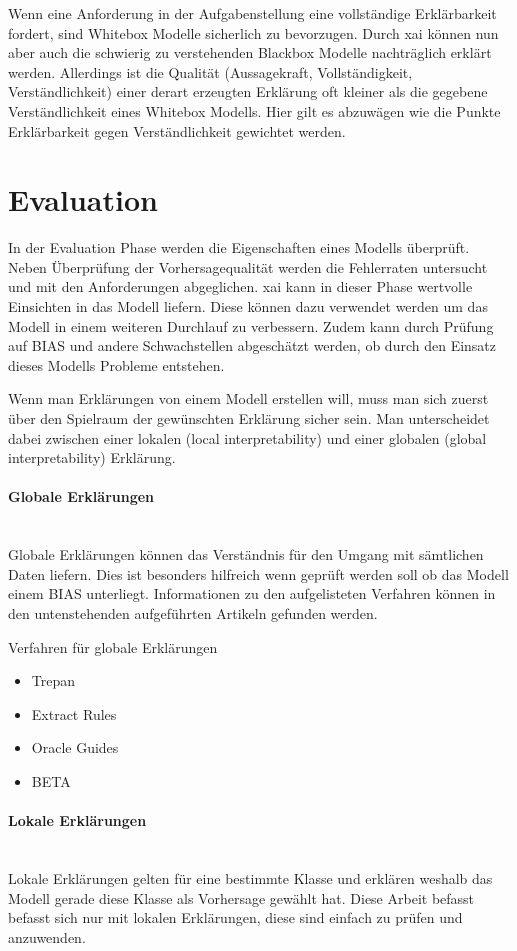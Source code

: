 \documentclass[
  12pt, %
  a4paper, %
  oneside, %
  openany, 
  numbers=noenddot, %
  BCOR=5mm, %
  parskip=half*, %
  thesis, %
]{bfhbook}
\newcommand{\parag}[1]{\paragraph*{#1}\mbox{}\\}
\begin{document}
Wenn eine Anforderung in der Aufgabenstellung eine vollständige Erklärbarkeit fordert, sind Whitebox Modelle sicherlich zu bevorzugen. Durch \Gls{xai} können nun aber auch die schwierig zu verstehenden Blackbox Modelle nachträglich erklärt werden. Allerdings ist die Qualität (Aussagekraft, Vollständigkeit, Verständlichkeit) einer derart erzeugten Erklärung oft kleiner als die gegebene Verständlichkeit eines Whitebox Modells. Hier gilt es abzuwägen wie die Punkte Erklärbarkeit gegen Verständlichkeit gewichtet werden.

\section{Evaluation}
In der Evaluation Phase werden die Eigenschaften eines Modells überprüft. Neben Überprüfung der Vorhersagequalität werden die Fehlerraten untersucht und mit den Anforderungen abgeglichen. \Gls{xai} kann in dieser Phase wertvolle Einsichten in das Modell liefern. Diese können dazu verwendet werden um das Modell in einem weiteren Durchlauf zu verbessern. Zudem kann durch Prüfung auf \Gls{BIAS} und andere Schwachstellen abgeschätzt werden, ob durch den Einsatz dieses Modells Probleme entstehen.

Wenn man Erklärungen von einem Modell erstellen will, muss man sich zuerst über den Spielraum der gewünschten Erklärung sicher sein. Man unterscheidet dabei zwischen einer lokalen (local interpretability) und einer globalen (global interpretability) Erklärung.

\parag{Globale Erklärungen}
Globale Erklärungen können das Verständnis für den Umgang mit sämtlichen Daten liefern. Dies ist besonders hilfreich wenn geprüft werden soll ob das Modell einem \Gls{BIAS} unterliegt. Informationen zu den aufgelisteten Verfahren können in den untenstehenden aufgeführten Artikeln gefunden werden.

Verfahren für globale Erklärungen
\begin{itemize}
	\item Trepan \parencite{10.5555/2998828.2998832}
	\item Extract Rules \parencite{Craven1994}
	\item Oracle Guides \parencite{Johansson2009}
	\item BETA \parencite{Lakkaraju2017}
\end{itemize}

\parag{Lokale Erklärungen}
Lokale Erklärungen gelten für eine bestimmte Klasse und erklären weshalb das Modell gerade diese Klasse als Vorhersage gewählt hat. Diese Arbeit befasst befasst sich nur mit lokalen Erklärungen, diese sind einfach zu prüfen und anzuwenden.
\end{document}
